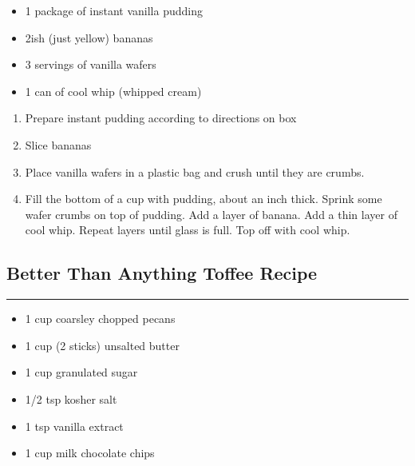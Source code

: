 \documentclass{article}
\begin{document}
\begin{framed}
    \begin{itemize}
        \item 1 package of instant vanilla pudding
        \item 2ish (just yellow) bananas
        \item 3 servings of vanilla wafers
        \item 1 can of cool whip (whipped cream)
    \end{itemize}
\end{framed}

\begin{enumerate}
    \item 
        Prepare instant pudding according to directions on box
    \item 
        Slice bananas
    \item 
        Place vanilla wafers in a plastic bag and crush until they are crumbs.
    \item 
        Fill the bottom of a cup with pudding, about an inch thick. Sprink some wafer crumbs on top of pudding. Add a layer of banana. Add a thin layer of cool whip. Repeat layers until glass is full. Top off with cool whip.
\end{enumerate}
\newpage

\subsection{Better Than Anything Toffee Recipe} 
\noindent\rule[0.5ex]{\linewidth}{1pt}

\begin{framed}
    \begin{itemize}
        \item 1 cup coarsley chopped pecans
        \item 1 cup (2 sticks) unsalted butter
        \item 1 cup granulated sugar
        \item 1/2 tsp kosher salt
        \item 1 tsp vanilla extract
        \item 1 cup milk chocolate chips
    \end{itemize}
\end{framed}
\end{document}
